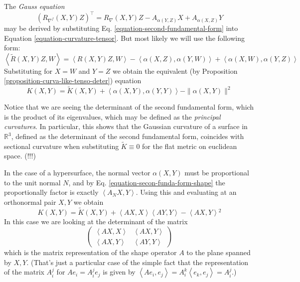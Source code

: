\documentclass{book}
\begin{document}
The {\it Gauss equation}
$$
(R_{\nabla^f}(X,Y)Z)^\top=R_\nabla(X,Y)Z-
A_{\alpha(Y,Z)}X+A_{\alpha(X,Z)}Y
$$
may be derived by substituting Eq.
\ref{equation-second-fundamental-form}
into Equation
\ref{equation-curvature-tensor}. But most
likely we will use the
following form:
\begin{equation}
\label{equation-Gauss}
\left\langle{}\tilde{R}(X,Y)Z,W\right\rangle{}=\left\langle{}R(X,Y)Z,
W\right\rangle{}
-\left\langle{}\alpha(X,Z),\alpha(Y,W)\right\rangle{}+
\left\langle{}\alpha(X,W),\alpha(Y,Z)\right\rangle{}
\end{equation}
Substituting for $X=W$ and $Y=Z$ we obtain
the equivalent (by Proposition
\ref{proposition-curva-like-tenso-deter})
equation
\begin{equation}
\label{equation-Gauss-sectional-curvature}
K(X,Y)=\tilde{K}(X,Y)+\left\langle{}\alpha(X,Y),
\alpha(Y,Y)\right\rangle{}-\|\alpha(X,Y)\|^2
\end{equation}

Notice that we are seeing the determinant of
the second fundamental form, which
is the product of its eigenvalues, which may
be defined as the {\it principal
curvatures}. In particular, this shows that
the Gaussian curvature of a surface
in $\mathbb{R}^3$, defined as the determinant
of the second fundamental form,
coincides with sectional curvature when
substituting $\tilde{K}\equiv0$ for
 the flat metric on euclidean space. (!!!)

In the case of a hypersurface, the normal
vector $\alpha(X,Y)$ must be
proportional to the unit normal $N$, and by
Eq.
\ref{equation-secon-funda-form-shape} the
proportionally
factor is exactly $\left\langle{}A_N X,Y\right\rangle{}$.
Using this and evaluating
 at an orthonormal pair $X,Y$ we obtain
\begin{equation}
\label{equation-gauss-secti-curva-shape}
K(X,Y)=\tilde{K}(X,Y)+\left\langle{}AX,
X\right\rangle{}\left\langle{}AY,Y\right\rangle{}-\left\langle{}AX,Y\right\rangle{}^2
\end{equation}
In this case we are looking at the
determinant of the matrix
\begin{equation}
\label{equation-matrix-of-shape-operator}
\begin{pmatrix}
\left\langle{}AX,X\right\rangle{}&\left\langle{}AX,Y\right\rangle{}\\
\left\langle{}AX,Y\right\rangle{}&\left\langle{}AY,Y\right\rangle{}
\end{pmatrix}
\end{equation}
which is the matrix representation of the
shape operator $A$ to the plane
spanned by $X,Y$. (That's just a particular
case of the simple fact that the
representation of the matrix $A_i^j$ for
$Ae_i=A_i^je_j$ is given by
$\left\langle{}Ae_i,e_j\right\rangle{}=A^k_i\left\langle{}e_k,
e_j\right\rangle{}=A^j_i$.)
\end{document}
